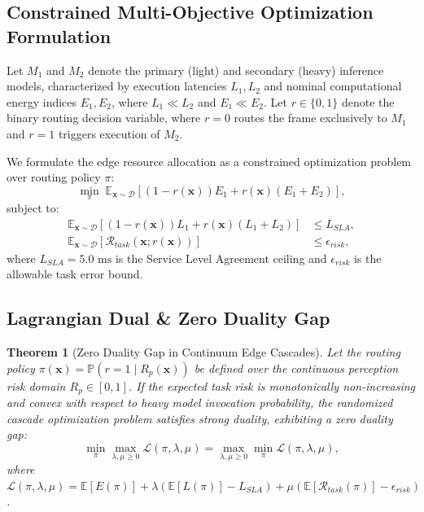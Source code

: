 \documentclass[conference]{IEEEtran}
\newtheorem{theorem}{Theorem}
\begin{document}
\subsection{Constrained Multi-Objective Optimization Formulation}
Let $M_1$ and $M_2$ denote the primary (light) and secondary (heavy) inference models, characterized by execution latencies $L_1, L_2$ and nominal computational energy indices $E_1, E_2$, where $L_1 \ll L_2$ and $E_1 \ll E_2$.
Let $r \in \{0, 1\}$ denote the binary routing decision variable, where $r=0$ routes the frame exclusively to $M_1$ and $r=1$ triggers execution of $M_2$.

We formulate the edge resource allocation as a constrained optimization problem over routing policy $\pi$:
\begin{equation}
\min_{\pi} \; \mathbb{E}_{\mathbf{x} \sim \mathcal{D}} \left[ (1 - r(\mathbf{x})) E_1 + r(\mathbf{x}) (E_1 + E_2) \right],
\end{equation}
subject to:
\begin{align}
\mathbb{E}_{\mathbf{x} \sim \mathcal{D}} \left[ (1 - r(\mathbf{x})) L_1 + r(\mathbf{x}) (L_1 + L_2) \right] &\le L_{SLA}, \\
\mathbb{E}_{\mathbf{x} \sim \mathcal{D}} \left[ \mathcal{R}_{task}(\mathbf{x}; r(\mathbf{x})) \right] &\le \epsilon_{risk},
\end{align}
where $L_{SLA} = 5.0\text{ ms}$ is the Service Level Agreement ceiling and $\epsilon_{risk}$ is the allowable task error bound.

\subsection{Lagrangian Dual \& Zero Duality Gap}
\begin{theorem}[Zero Duality Gap in Continuum Edge Cascades]
Let the routing policy $\pi(\mathbf{x}) = \mathbb{P}(r=1 \mid R_p(\mathbf{x}))$ be defined over the continuous perception risk domain $R_p \in [0, 1]$. If the expected task risk is monotonically non-increasing and convex with respect to heavy model invocation probability, the randomized cascade optimization problem satisfies strong duality, exhibiting a zero duality gap:
\begin{equation}
\min_{\pi} \max_{\lambda, \mu \ge 0} \mathcal{L}(\pi, \lambda, \mu) = \max_{\lambda, \mu \ge 0} \min_{\pi} \mathcal{L}(\pi, \lambda, \mu),
\end{equation}
where $\mathcal{L}(\pi, \lambda, \mu) = \mathbb{E}[E(\pi)] + \lambda (\mathbb{E}[L(\pi)] - L_{SLA}) + \mu (\mathbb{E}[\mathcal{R}_{task}(\pi)] - \epsilon_{risk})$.
\end{theorem}
\end{document}

